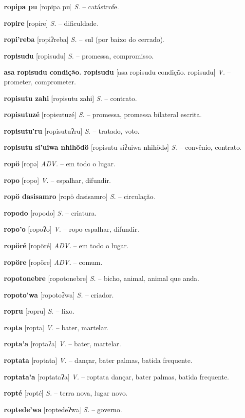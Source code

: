 \textbf{ropipa pu} [ropipa pu] \textit{S.} -- catástrofe.

\textbf{ropire} [ropire] \textit{S.} -- dificuldade.

\textbf{ropi'reba} [ropiʔreba] \textit{S.} -- sul (por baixo do cerrado).

\textbf{ropisudu} [ropisudu] \textit{S.} -- promessa, compromisso.

\textbf{asa ropisudu condição. ropisudu} [asa ropisudu condição. ropisudu] \textit{V.} -- prometer, comprometer.

\textbf{ropisutu zahi} [ropisutu zahi] \textit{S.} -- contrato.

\textbf{ropisutuzé} [ropisutuzé] \textit{S.} -- promessa, promessa bilateral escrita.

\textbf{ropisutu'ru} [ropisutuʔru] \textit{S.} -- tratado, voto.

\textbf{ropisutu si'uiwa nhihödö} [ropisutu siʔuiwa nhihödə] \textit{S.} -- convênio, contrato.

\textbf{ropö} [ropə] \textit{ADV.} -- em todo o lugar.

\textbf{ropo} [ropo] \textit{V.} -- espalhar, difundir.

\textbf{ropö dasisamro} [ropö dasisamro] \textit{S.} -- circulação.

\textbf{ropodo} [ropodo] \textit{S.} -- criatura.

\textbf{ropo'o} [ropoʔo] \textit{V.} -- ropo espalhar, difundir.

\textbf{ropöré} [ropöré] \textit{ADV.} -- em todo o lugar.

\textbf{ropöre} [ropöre] \textit{ADV.} -- comum.

\textbf{ropotonebre} [ropotonebre] \textit{S.} -- bicho, animal, animal que anda.

\textbf{ropoto'wa} [ropotoʔwa] \textit{S.} -- criador.

\textbf{ropru} [ropru] \textit{S.} -- lixo.

\textbf{ropta} [ropta] \textit{V.} -- bater, martelar.

\textbf{ropta'a} [roptaʔa] \textit{V.} -- bater, martelar.

\textbf{roptata} [roptata] \textit{V.} -- dançar, bater palmas, batida frequente.

\textbf{roptata'a} [roptataʔa] \textit{V.} -- roptata dançar, bater palmas, batida frequente.

\textbf{ropté} [ropté] \textit{S.} -- terra nova, lugar novo.

\textbf{roptede'wa} [roptedeʔwa] \textit{S.} -- governo.

